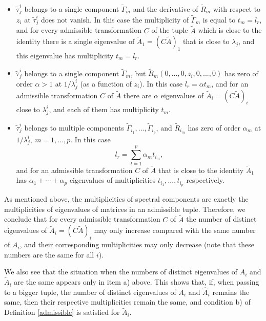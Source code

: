 \documentclass[draft, 12pt, reqno]{amsart}
\numberwithin{equation}{section}
\theoremstyle{plain}
\begin{document}
\begin{itemize}
\item[a)] $\widetilde{\tau}_j^i$ belongs to a single component $\widetilde{\Gamma}_m$ and the derivative of $\widetilde{R}_m$ with respect to $z_i$ at $\widetilde{\tau}_j^i$ does not vanish. In this case the multiplicity of $\widetilde{\Gamma}_m$ is equal to $t_m=l_r$, and for every admissible transformation $C$ of the tuple $\widetilde{A}$ which is close to the identity there is a single eigenvalue of $\widetilde{A}_1=(C\widetilde{A})_1$ that is close to $\lambda_j$, and this eigenvalue has multiplicity $t_m=l_r$.
\item[b)] $\widetilde{\tau}_j^i$ belongs to a single component $\widetilde{\Gamma}_m$,  but  %
$\widetilde{R}_m(0,...,0,z_i,0,...,0)$ has zero of order $\alpha >1$  at $1/\lambda_j^i$ (as a function of $z_i$).
In this case  $l_r=\alpha t_m$,  
 and for an admissible transformation $C$ of $\widetilde{A}$ there are $\alpha$ eigenvalues of $\widetilde{A}_i=(C\widetilde{A})_i$  close to $\lambda_j^i$, and each of them has multiplicity $t_m$.
\item[c)] $\widetilde{\tau}_j^i $ belongs to multiple components $\widetilde{\Gamma}_{i_1}, ...,\widetilde{\Gamma}_{i_p}$, and $\widetilde{R}_{i_m} $ has zero of order $\alpha_m$ at $1/\lambda_j^i, \ m=1,...,p$. In this case 
$$l_r=\displaystyle \sum_{t=1}^p \alpha_mt_{i_m},$$ 
and for an admissible transformation $C$ of $\widetilde{A}$ that is close to the identity $\widetilde{A}_1$ has $\alpha_1+\cdots +\alpha_p$ eigenvalues of multiplicities $t_{i_1},...,t_{i_p}$ respectively.
\end{itemize}

As mentioned above, the multiplicities of spectral components are exactly the multiplicities of eigenvalues of matrices in an admissible tuple. Therefore, we conclude that for every admissible transformation $C$ of $\widetilde{A}$ the number of distinct eigenvalues of $\widetilde{A}_i=(C\widetilde{A})_i$ may only increase compared with the same number of $A_i$, and their corresponding multiplicities may only decrease (note that these numbers are the same for all $i$).

We also see that the situation when the numbers of distinct eigenvalues of $A_i$ and $\widetilde{A}_i$ are the same appears only in item a) above. This shows that, if, when passing to a bigger tuple, the number of distinct eigenvalues of $A_i$ and $\widehat{A}_i$ remains the same, then their respective multiplicities remain the same, and condition b) of Definition \ref{admissible} is satisfied for $\widetilde{A}_i$.
\end{document}
